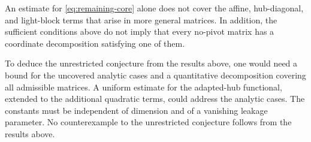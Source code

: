 An estimate for \eqref{eq:remaining-core} alone does not cover the affine, hub-diagonal, and light-block terms that arise in more general matrices. In addition, the sufficient conditions above do not imply that every no-pivot matrix has a coordinate decomposition satisfying one of them.

To deduce the unrestricted conjecture from the results above, one would need a bound for the uncovered analytic cases and a quantitative decomposition covering all admissible matrices. A uniform estimate for the adapted-hub functional, extended to the additional quadratic terms, could address the analytic cases. The constants must be independent of dimension and of a vanishing leakage parameter. No counterexample to the unrestricted conjecture follows from the results above.

